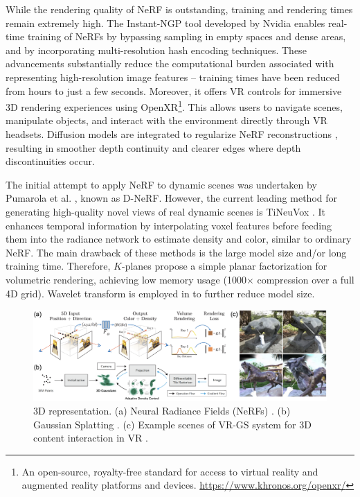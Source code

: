 \documentclass[11pt,a4paper]{article}
\begin{document}
While the rendering quality of NeRF is outstanding, training and rendering times remain extremely high. The Instant-NGP tool developed by Nvidia \cite{mueller:instant:2022} enables real-time training of NeRFs by bypassing sampling in empty spaces and dense areas, and by incorporating multi-resolution hash encoding techniques. These advancements substantially reduce the computational burden associated with representing high-resolution image features -- training times have been reduced from hours to just a few seconds. Moreover, it offers VR controls for immersive 3D rendering experiences using OpenXR\footnote{An open-source, royalty-free standard for access to virtual reality and augmented reality platforms and devices. \url{https://www.khronos.org/openxr/}}. This allows users to navigate scenes, manipulate objects, and interact with the environment directly through VR headsets. Diffusion models are integrated to regularize NeRF reconstructions \cite{wynn:diffusionerf:2023}, resulting in smoother depth continuity and clearer edges where depth discontinuities occur.

The initial attempt to apply NeRF to dynamic scenes was undertaken by Pumarola et al. \cite{pumarola:DNeRF:2020}, known as D-NeRF.
However, the current leading method for generating high-quality novel views of real dynamic scenes is TiNeuVox \cite{Fang:Fast:2022}.  It enhances temporal information by interpolating voxel features before feeding them into the radiance network to estimate density and color, similar to ordinary NeRF. The main drawback of these methods is the large model size and/or long training time. Therefore, $K$-planes \cite{Fridovich:kplanes:2023} propose a simple planar factorization for volumetric rendering, achieving low memory usage (1000$\times$ compression over a full 4D grid). Wavelet transform is employed in \cite{azzarelli:waveplanes:2023} to further reduce model size.

\begin{figure}
    \centering
    \includegraphics[width=\textwidth]{figures/3Drepresentation.png}
    \caption{3D representation. (a) Neural Radiance Fields (NeRFs) \cite{Mildenhall:NeRF:2020}. (b) Gaussian Splatting \cite{kerbl:3Dgaussians:2023}. (c) Example scenes of VR-GS system for 3D content interaction in VR \cite{jiang:vrgs:2024}. }
    \label{fig:3Drepresentation}
\end{figure}
\end{document}

